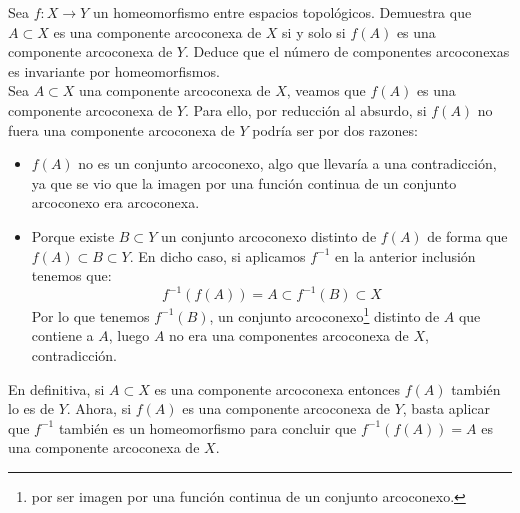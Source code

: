 \begin{ejercicio}
    Sea $f:X\to Y$ un homeomorfismo entre espacios topológicos. Demuestra que $A\subset X$ es una componente arcoconexa de $X$ si y solo si $f(A)$ es una componente arcoconexa de $Y$. Deduce que el número de componentes arcoconexas es invariante por homeomorfismos.\\

    \noindent
    Sea $A\subset X$ una componente arcoconexa de $X$, veamos que $f(A)$ es una componente arcoconexa de $Y$. Para ello, por reducción al absurdo, si $f(A)$ no fuera una componente arcoconexa de $Y$ podría ser por dos razones:
    \begin{itemize}
        \item $f(A)$ no es un conjunto arcoconexo, algo que llevaría a una contradicción, ya que se vio que la imagen por una función continua de un conjunto arcoconexo era arcoconexa.
        \item Porque existe $B\subset Y$ un conjunto arcoconexo distinto de $f(A)$ de forma que $f(A)\subset B\subset Y$. En dicho caso, si aplicamos $f^{-1}$ en la anterior inclusión tenemos que:
            \begin{equation*}
                f^{-1}(f(A)) = A \subset f^{-1}(B) \subset X
            \end{equation*}
            Por lo que tenemos $f^{-1}(B)$, un conjunto arcoconexo\footnote{por ser imagen por una función continua de un conjunto arcoconexo.} distinto de $A$ que contiene a $A$, luego $A$ no era una componentes arcoconexa de $X$, contradicción.
    \end{itemize}
    En definitiva, si $A\subset X$ es una componente arcoconexa entonces $f(A)$ también lo es de $Y$. Ahora, si $f(A)$ es una componente arcoconexa de $Y$, basta aplicar que $f^{-1}$ también es un homeomorfismo para concluir que $f^{-1}(f(A)) = A$ es una componente arcoconexa de $X$.\\


\end{ejercicio}
